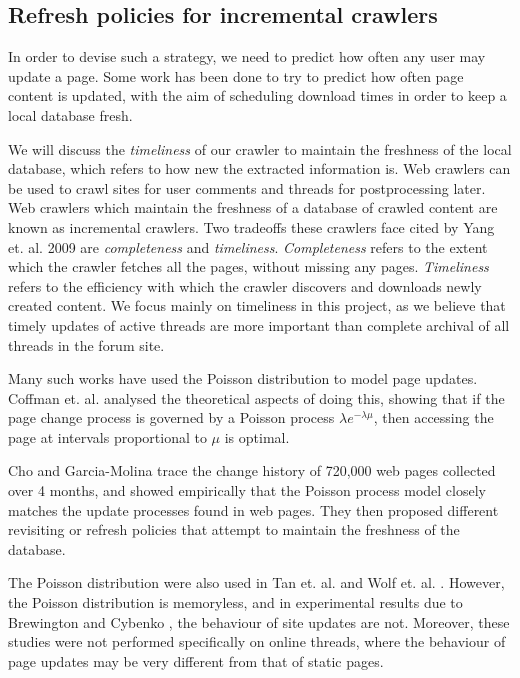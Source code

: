 \documentclass[12 pt]{article}
\begin{document}
\subsection{Refresh policies for incremental crawlers}
In order to devise such a strategy, we need to predict how often any user may update a page. Some work has been done to try to predict how often page content is updated, with the aim of scheduling download times in order to keep a local database fresh.


We will discuss the \emph{timeliness} of our crawler to maintain the freshness of the local database, which refers to how new the extracted information is. Web crawlers can be used to crawl sites for user comments and threads for postprocessing later. Web crawlers which maintain the freshness of a database of crawled content are known as incremental crawlers. Two tradeoffs these crawlers face cited by Yang et. al. 2009 \cite{Yang2009} are \emph{completeness} and \emph{timeliness}. \emph{Completeness} refers to the extent which the crawler fetches all the pages, without missing any pages. \emph{Timeliness} refers to the efficiency with which the crawler discovers and downloads newly created content. We focus mainly on timeliness in this project, as we believe that timely updates of active threads are more important than complete archival of all threads in the forum site.

Many such works have used the Poisson distribution to model page updates. Coffman et. al. \cite{Coffman1997} analysed the theoretical aspects of doing this, showing that if the page change process is governed by a Poisson process $\lambda e^{-\lambda \mu}$, then accessing the page at intervals proportional to $\mu$ is optimal.

Cho and Garcia-Molina trace the change history of 720,000 web pages collected over 4 months, and showed empirically that the Poisson process model closely matches the update processes found in web pages\cite{Cho1999}. They then proposed different revisiting or refresh policies \cite{Cho2003,Garcia-molina2003} that attempt to maintain the freshness of the database.

The Poisson distribution were also used in Tan et. al. \cite{Tan2007} and Wolf et. al. \cite{Wolf2002}. %
However, the Poisson distribution is memoryless, and in experimental results due to Brewington and Cybenko \cite{Brian2000}, the behaviour of site updates are not. Moreover, these studies were not performed specifically on online threads, where the behaviour of page updates may be very different from that of static pages.
\end{document}
